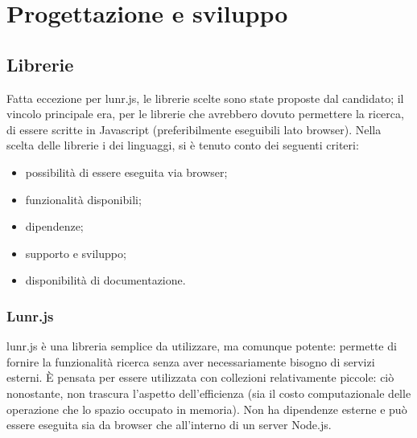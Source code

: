 
\chapter{Progettazione e sviluppo}
\label{cap:progettazione-sviluppo}


\section{Librerie}
Fatta eccezione per lunr.js, le librerie scelte sono state proposte dal candidato; il vincolo principale era, per le librerie che avrebbero dovuto permettere la ricerca, di essere scritte in Javascript (preferibilmente eseguibili lato browser).
Nella scelta delle librerie i dei linguaggi, si è tenuto conto dei seguenti criteri:
\begin{itemize}
    \item possibilità di essere eseguita via browser;
    \item funzionalità disponibili;
    \item dipendenze;
    \item supporto e sviluppo;
    \item disponibilità di documentazione.
\end{itemize}

\subsection{Lunr.js}
lunr.js è una libreria semplice da utilizzare, ma comunque potente: permette di fornire la funzionalità ricerca senza aver necessariamente bisogno di servizi esterni. 
È pensata per essere utilizzata con collezioni relativamente piccole: ciò nonostante, non trascura l'aspetto dell'efficienza (sia il costo computazionale delle operazione che lo spazio occupato in memoria). 
Non ha dipendenze esterne e può essere eseguita sia da browser che all'interno di un server Node.js.

